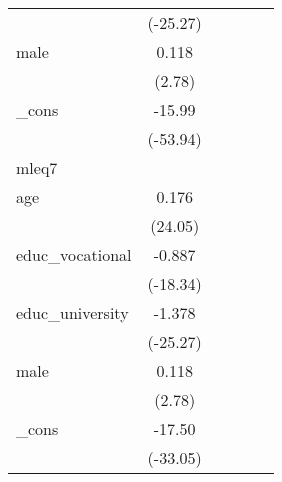 {\begin{tabular}{l*{5}{c}}
            &    (-25.27)         &                     &                     &                     &                     \\
[1em]
male        &       0.118\sym{**} &                     &                     &                     &                     \\
            &      (2.78)         &                     &                     &                     &                     \\
[1em]
\_cons      &      -15.99\sym{***}&                     &                     &                     &                     \\
            &    (-53.94)         &                     &                     &                     &                     \\
\hline
mleq7       &                     &                     &                     &                     &                     \\
age         &       0.176\sym{***}&                     &                     &                     &                     \\
            &     (24.05)         &                     &                     &                     &                     \\
[1em]
educ\_vocational&      -0.887\sym{***}&                     &                     &                     &                     \\
            &    (-18.34)         &                     &                     &                     &                     \\
[1em]
educ\_university&      -1.378\sym{***}&                     &                     &                     &                     \\
            &    (-25.27)         &                     &                     &                     &                     \\
[1em]
male        &       0.118\sym{**} &                     &                     &                     &                     \\
            &      (2.78)         &                     &                     &                     &                     \\
[1em]
\_cons      &      -17.50\sym{***}&                     &                     &                     &                     \\
            &    (-33.05)         &                     &                     &                     &                     \\

\end{tabular}}
